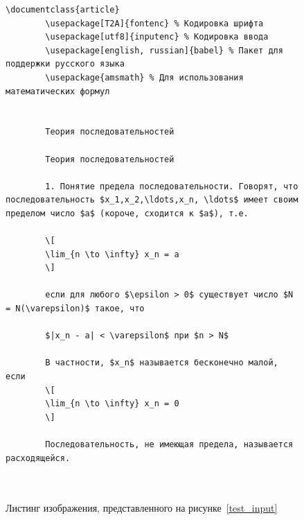 \begin{figure}
    \begin{lstlisting}[language={[LaTeX]TeX}]
        \documentclass{article}
        \usepackage[T2A]{fontenc} % Кодировка шрифта
        \usepackage[utf8]{inputenc} % Кодировка ввода
        \usepackage[english, russian]{babel} % Пакет для поддержки русского языка
        \usepackage{amsmath} % Для использования математических формул
            
        
        Теория последовательностей
        
        Теория последовательностей
        
        1. Понятие предела последовательности. Говорят, что последовательность $x_1,x_2,\ldots,x_n, \ldots$ имеет своим пределом число $a$ (короче, сходится к $a$), т.е.
        
        \[
        \lim_{n \to \infty} x_n = a
        \]
        
        если для любого $\epsilon > 0$ существует число $N = N(\varepsilon)$ такое, что
        
        $|x_n - a| < \varepsilon$ при $n > N$
        
        В частности, $x_n$ называется бесконечно малой, если
        \[
        \lim_{n \to \infty} x_n = 0
        \]
        
        Последовательность, не имеющая предела, называется расходящейся.
            
        
    \end{lstlisting}
    \caption{Листинг изображения, представленного на рисунке~\ref{test_input}}
    \label{test_listing}
\end{figure}